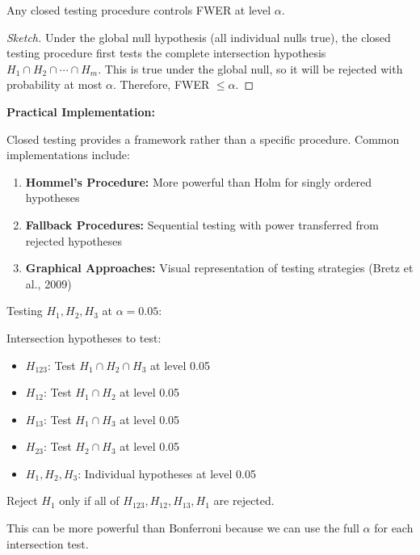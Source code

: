 \begin{theorem}
Any closed testing procedure controls FWER at level $\alpha$.
\end{theorem}

\begin{proof}[Sketch]
Under the global null hypothesis (all individual nulls true), the closed testing procedure first tests the complete intersection hypothesis $H_1 \cap H_2 \cap \cdots \cap H_m$. This is true under the global null, so it will be rejected with probability at most $\alpha$. Therefore, FWER $\leq \alpha$.
\end{proof}

\textbf{Practical Implementation:}

Closed testing provides a framework rather than a specific procedure. Common implementations include:

\begin{enumerate}
    \item \textbf{Hommel's Procedure:} More powerful than Holm for singly ordered hypotheses
    \item \textbf{Fallback Procedures:} Sequential testing with power transferred from rejected hypotheses
    \item \textbf{Graphical Approaches:} Visual representation of testing strategies (Bretz et al., 2009)
\end{enumerate}

\begin{example}
Testing $H_1, H_2, H_3$ at $\alpha = 0.05$:

Intersection hypotheses to test:
\begin{itemize}
    \item $H_{123}$: Test $H_1 \cap H_2 \cap H_3$ at level 0.05
    \item $H_{12}$: Test $H_1 \cap H_2$ at level 0.05
    \item $H_{13}$: Test $H_1 \cap H_3$ at level 0.05
    \item $H_{23}$: Test $H_2 \cap H_3$ at level 0.05
    \item $H_1, H_2, H_3$: Individual hypotheses at level 0.05
\end{itemize}

Reject $H_1$ only if all of $H_{123}, H_{12}, H_{13}, H_1$ are rejected.

This can be more powerful than Bonferroni because we can use the full $\alpha$ for each intersection test.
\end{example}


